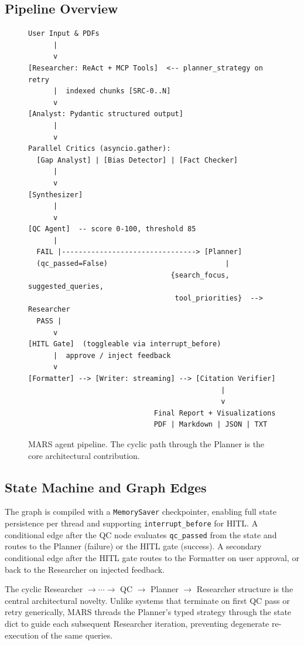 \documentclass[11pt]{article}
\begin{document}
\subsection{Pipeline Overview}

\begin{figure}[h]
\centering
\begin{lstlisting}[basicstyle=\ttfamily\footnotesize, backgroundcolor=\color{codebg}]
User Input & PDFs
      |
      v
[Researcher: ReAct + MCP Tools]  <-- planner_strategy on retry
      |  indexed chunks [SRC-0..N]
      v
[Analyst: Pydantic structured output]
      |
      v
Parallel Critics (asyncio.gather):
  [Gap Analyst] | [Bias Detector] | [Fact Checker]
      |
      v
[Synthesizer]
      |
      v
[QC Agent]  -- score 0-100, threshold 85
      |
  FAIL |--------------------------------> [Planner]
  (qc_passed=False)                            |
                                  {search_focus, suggested_queries,
                                   tool_priorities}  --> Researcher
  PASS |
      v
[HITL Gate]  (toggleable via interrupt_before)
      |  approve / inject feedback
      v
[Formatter] --> [Writer: streaming] --> [Citation Verifier]
                                              |
                                              v
                              Final Report + Visualizations
                              PDF | Markdown | JSON | TXT
\end{lstlisting}
\caption{MARS agent pipeline. The cyclic path through the Planner is the core architectural contribution.}
\label{fig:pipeline}
\end{figure}

\subsection{State Machine and Graph Edges}

The graph is compiled with a \texttt{MemorySaver} checkpointer, enabling full
state persistence per thread and supporting \texttt{interrupt\_before} for HITL.
A conditional edge after the QC node evaluates \texttt{qc\_passed} from the
state and routes to the Planner (failure) or the HITL gate (success). A
secondary conditional edge after the HITL gate routes to the Formatter on user
approval, or back to the Researcher on injected feedback.

The cyclic Researcher $\to \cdots \to$ QC $\to$ Planner $\to$ Researcher
structure is the central architectural novelty. Unlike systems that terminate on
first QC pass or retry generically, MARS threads the Planner's typed strategy
through the state dict to guide each subsequent Researcher iteration, preventing
degenerate re-execution of the same queries.
\end{document}

